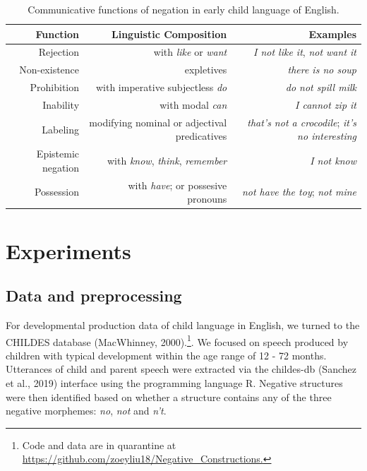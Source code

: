 \documentclass[10pt, letterpaper]{article}
\begin{document}
\begin{table}[h]
\small
\centering
\begin{tabular}{rrr}
  \hline
 \textbf{Function} & \textbf{Linguistic Composition} & \textbf{Examples} \\
  \hline
Rejection & with \textit{like} or \textit{want} & \textit{I not like it}, \textit{not want it}  \\
Non-existence & expletives & \textit{there is no soup} \\
Prohibition & with imperative subjectless \textit{do} & \textit{do not spill milk} \\
Inability & with modal \textit{can} & \textit{I cannot zip it} \\
Labeling & modifying nominal or adjectival predicatives & \textit{that's not a crocodile}; \textit{it's no interesting} \\
Epistemic negation & with \textit{know}, \textit{think}, \textit{remember}  & \textit{I not know} \\
Possession & with \textit{have}; or possesive pronouns & \textit{not have the toy}; \textit{not mine} \\
   \hline
\end{tabular}
\caption{Communicative functions of negation in early child language of English.}
\end{table}

\hypertarget{experiments}{%
\section{Experiments}\label{experiments}}

\hypertarget{data-and-preprocessing}{%
\subsection{Data and preprocessing}\label{data-and-preprocessing}}

For developmental production data of child language in English, we
turned to the CHILDES database (MacWhinney,
2000).\footnote{Code and data are in quarantine at \url{https://github.com/zoeyliu18/Negative_Constructions.}}.
We focused on speech produced by children with typical development
within the age range of 12 - 72 months. Utterances of child and parent
speech were extracted via the childes-db (Sanchez et al., 2019)
interface using the programming language R. Negative structures were
then identified based on whether a structure contains any of the three
negative morphemes: \emph{no}, \emph{not} and \emph{n't}.
\end{document}
